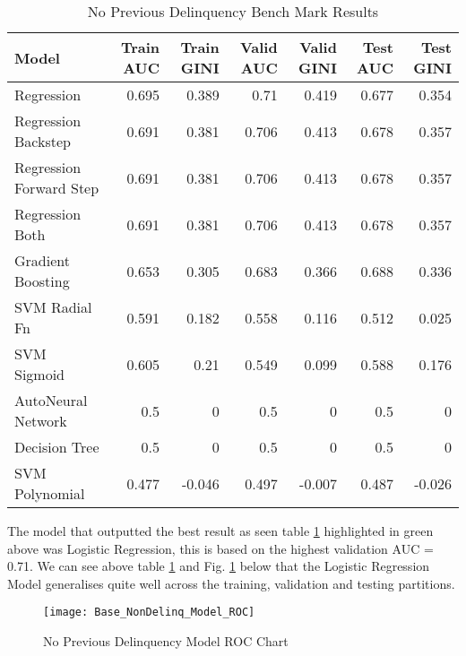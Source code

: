 \begin{table}[H]
	\centering
	\resizebox{\textwidth}{!}
	{
		\begin{tabular}{l | r | r| r |r| r|r}
			\hline
			\textbf{Model} & \textbf{Train AUC} & \textbf{Train GINI} & \textbf{Valid AUC} & \textbf{Valid GINI}& \textbf{Test AUC} & \textbf{Test GINI}\\
			\hline
			\cellcolor{green!25}Regression & \cellcolor{green!25}0.695 & \cellcolor{green!25}0.389 & \cellcolor{green!25}0.71 & \cellcolor{green!25}0.419 & \cellcolor{green!25}0.677 & \cellcolor{green!25}0.354 \\
			Regression Backstep & 0.691 & 0.381 & 0.706 & 0.413 & 0.678 & 0.357 \\
			Regression Forward Step & 0.691 & 0.381 & 0.706 & 0.413 & 0.678 & 0.357 \\
			Regression Both & 0.691 & 0.381 & 0.706 & 0.413 & 0.678 & 0.357 \\
			Gradient Boosting & 0.653 & 0.305 & 0.683 & 0.366 & 0.688 & 0.336 \\
			SVM Radial Fn & 0.591 & 0.182 & 0.558 & 0.116 & 0.512 & 0.025 \\
			SVM Sigmoid & 0.605 & 0.21 & 0.549 & 0.099 & 0.588 & 0.176 \\
			AutoNeural Network & 0.5 & 0 & 0.5 & 0 & 0.5 & 0 \\
			Decision Tree & 0.5 & 0 & 0.5 & 0 & 0.5 & 0 \\
			SVM Polynomial & 0.477 & -0.046 & 0.497 & -0.007 & 0.487 & -0.026 \\
			\hline
		\end{tabular}
	}
	\caption{No Previous Delinquency Bench Mark Results}
	\label{table:NoPreviousDelinquencyBaseModelDetails}
\end{table}

The model that outputted the best result as seen table \ref{table:NoPreviousDelinquencyBaseModelDetails} highlighted in green above  was Logistic Regression, this is based on the highest validation AUC = 0.71. We can see above table \ref{table:NoPreviousDelinquencyBaseModelDetails} and Fig. \ref{fig:NonDelinq_Model_ROC} below that the Logistic Regression Model generalises quite well across the training, validation and testing partitions.

\begin{figure}[H]
	\texttt{[image: Base\_NonDelinq\_Model\_ROC]}
	\caption{No Previous Delinquency Model ROC Chart}
	\label{fig:NonDelinq_Model_ROC}
\end{figure}

